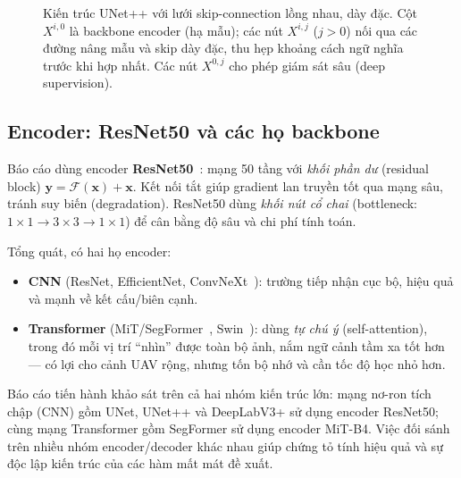 \begin{figure}[H]
{}
\caption{Kiến trúc UNet++ với lưới skip-connection lồng nhau, dày đặc. Cột $X^{i,0}$ là
backbone encoder (hạ mẫu); các nút $X^{i,j}$ ($j{>}0$) nối qua các đường nâng mẫu và
skip dày đặc, thu hẹp khoảng cách ngữ nghĩa trước khi hợp nhất. Các nút $X^{0,j}$ cho
phép giám sát sâu (deep supervision).}
\label{fig:unetpp}
\end{figure}

\subsection{Encoder: ResNet50 và các họ backbone}
Báo cáo dùng encoder \textbf{ResNet50}~\cite{he2016resnet}: mạng 50 tầng với
\emph{khối phần dư} (residual block) $\mathbf{y}=\mathcal{F}(\mathbf{x})+\mathbf{x}$.
Kết nối tắt giúp gradient lan truyền tốt qua mạng sâu, tránh suy biến (degradation).
ResNet50 dùng \emph{khối nút cổ chai} (bottleneck: $1{\times}1 \rightarrow 3{\times}3
\rightarrow 1{\times}1$) để cân bằng độ sâu và chi phí tính toán.

Tổng quát, có hai họ encoder:
\begin{itemize}[leftmargin=1.4cm]
  \item \textbf{CNN} (ResNet, EfficientNet, ConvNeXt~\cite{liu2022convnext}): trường
  tiếp nhận cục bộ, hiệu quả và mạnh về kết cấu/biên cạnh.
  \item \textbf{Transformer} (MiT/SegFormer~\cite{xie2021segformer},
  Swin~\cite{liu2021swin}): dùng \emph{tự chú ý} (self-attention), trong đó mỗi vị trí
  ``nhìn'' được toàn bộ ảnh, nắm ngữ cảnh tầm xa tốt hơn --- có lợi cho cảnh UAV rộng,
  nhưng tốn bộ nhớ và cần tốc độ học nhỏ hơn.
\end{itemize}
Báo cáo tiến hành khảo sát trên cả hai nhóm kiến trúc lớn: mạng nơ-ron tích chập (CNN) gồm UNet, UNet++ và DeepLabV3+ sử dụng encoder ResNet50; cùng mạng Transformer gồm SegFormer sử dụng encoder MiT-B4. Việc đối sánh trên nhiều nhóm encoder/decoder khác nhau giúp chứng tỏ tính hiệu quả và sự độc lập kiến trúc của các hàm mất mát đề xuất.

